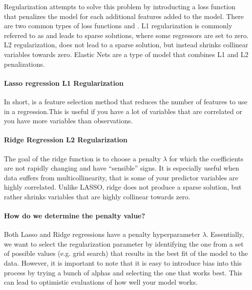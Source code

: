 \documentclass[letterpaper,10pt,english]{sphinxmanual}
\begin{document}
Regularization attempts to solve this problem by introducting a loss function that penalizes the model for each additional features added to the model. There are two common types of loss functions  and . L1 regularization is commonly referred to as  and leads to sparse solutions, where some regressors are set to zero. L2 regularization, does not lead to a sparse solution, but instead shrinks collinear variables towards zero. Elastic Nets are a type of model that combines L1 and L2 penalizations.


\paragraph{Lasso regression \sphinxhyphen{} L1 Regularization}
\label{\detokenize{content/Multivariate_Prediction:lasso-regression-l1-regularization}}
In short,  is a feature selection method that reduces the number of features to use in a regression.This is useful if you have a lot of variables that are correlated or you have more variables than observations.


\paragraph{Ridge Regression \sphinxhyphen{} L2 Regularization}
\label{\detokenize{content/Multivariate_Prediction:ridge-regression-l2-regularization}}
The goal of the ridge function is to choose a penalty \(\lambda\) for which the coefficients are not rapidly changing and have “sensible” signs. It is especially useful when data suffers from multicollinearity, that is some of your predictor variables are highly correlated. Unlike LASSO, ridge does not produce a sparse solution, but rather shrinks variables that are highly collinear towards zero.


\paragraph{How do we determine the penalty value?}
\label{\detokenize{content/Multivariate_Prediction:how-do-we-determine-the-penalty-value}}
Both Lasso and Ridge regressions have a penalty hyperparameter \(\lambda\). Essentially, we want to select the regularization parameter by identifying the one from a set of possible values (e.g. grid search) that results in the best fit of the model to the data.  However, it is important to note that it is easy to introduce bias into this process by trying a bunch of alphas and selecting the one that works best.  This can lead to optimistic evaluations of how well your model works.
\end{document}
